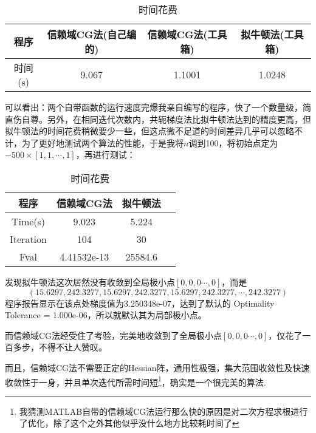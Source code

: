 \begin{table}[htbp]
  \centering
 \caption{时间花费}
    \begin{tabular}{cccc}
    \toprule
    程序&信赖域CG法(自己编的)&信赖域CG法(工具箱)&拟牛顿法(工具箱)\\
     \midrule
    时间(s)&9.067 &1.1001&1.0248\\
    \bottomrule
    \end{tabular}%
  \label{tab:addlabe3}%
\end{table}%

可以看出：两个自带函数的运行速度完爆我亲自编写的程序，快了一个数量级，简直伤自尊。另外，在相同迭代次数内，共轭梯度法比拟牛顿法达到的精度更高，但拟牛顿法的时间花费稍微要少一些，但这点微不足道的时间差异几乎可以忽略不计，为了更好地测试两个算法的性能，于是我将$n$调到100，将初始点定为$-500\times[1,1,\cdots,1]$，再进行测试：

\begin{table}[htbp]
  \centering
 \caption{时间花费}
    \begin{tabular}{cccc}
    \toprule
    程序&信赖域CG法&拟牛顿法\\
     \midrule
    Time(s) &9.023&5.224\\
    Iteration&104&30\\
    Fval&4.41532e-13&25584.6\\
    \bottomrule
    \end{tabular}%
  \label{tab:addlabe3}%
\end{table}%

发现拟牛顿法这次居然没有收敛到全局极小点$[0,0,0\cdots,0]$，而是\[(15.6297,242.3277,15.6297,242.3277,15.6297,242.3277,\cdots,242.3277)\] 
程序报告显示在该点处梯度值为3.250348e-07，达到了默认的 Optimality Tolerance = 1.000e-06，所以就默认其为局部极小点。

而信赖域CG法经受住了考验，完美地收敛到了全局极小点$[0,0,0\cdots,0]$，仅花了一百多步，不得不让人赞叹。

而且，信赖域CG法不需要正定的Hessian阵，通用性极强，集大范围收敛性及快速收敛性于一身，并且单次迭代所需时间短\footnote{我猜测MATLAB自带的信赖域CG法运行那么快的原因是对二次方程求根进行了优化，除了这个之外其他似乎没什么地方比较耗时间了}，确实是一个很完美的算法.